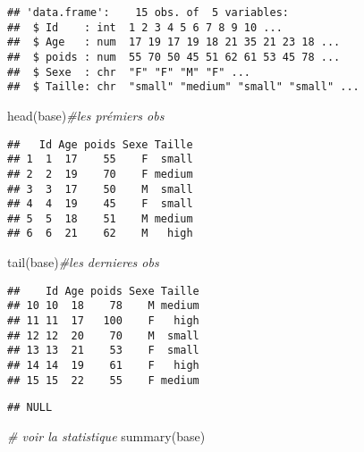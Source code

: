 \documentclass[
]{article}
\newenvironment{Shaded}{\begin{snugshade}}{\end{snugshade}}
\newcommand{\CommentTok}[1]{\textcolor[rgb]{0.56,0.35,0.01}{\textit{#1}}}
\newcommand{\FunctionTok}[1]{\textcolor[rgb]{0.00,0.00,0.00}{#1}}
\newcommand{\NormalTok}[1]{#1}
\newcommand{\SpecialCharTok}[1]{\textcolor[rgb]{0.00,0.00,0.00}{#1}}
\begin{document}
\begin{verbatim}
## 'data.frame':    15 obs. of  5 variables:
##  $ Id    : int  1 2 3 4 5 6 7 8 9 10 ...
##  $ Age   : num  17 19 17 19 18 21 35 21 23 18 ...
##  $ poids : num  55 70 50 45 51 62 61 53 45 78 ...
##  $ Sexe  : chr  "F" "F" "M" "F" ...
##  $ Taille: chr  "small" "medium" "small" "small" ...
\end{verbatim}

\begin{Shaded}
\begin{Highlighting}[]
\FunctionTok{head}\NormalTok{(base)}\CommentTok{\#les prémiers obs}
\end{Highlighting}
\end{Shaded}

\begin{verbatim}
##   Id Age poids Sexe Taille
## 1  1  17    55    F  small
## 2  2  19    70    F medium
## 3  3  17    50    M  small
## 4  4  19    45    F  small
## 5  5  18    51    M medium
## 6  6  21    62    M   high
\end{verbatim}

\begin{Shaded}
\begin{Highlighting}[]
\FunctionTok{tail}\NormalTok{(base)}\CommentTok{\#les dernieres obs}
\end{Highlighting}
\end{Shaded}

\begin{verbatim}
##    Id Age poids Sexe Taille
## 10 10  18    78    M medium
## 11 11  17   100    F   high
## 12 12  20    70    M  small
## 13 13  21    53    F  small
## 14 14  19    61    F   high
## 15 15  22    55    F medium
\end{verbatim}

\begin{Shaded}
\end{Shaded}

\begin{verbatim}
## NULL
\end{verbatim}

\begin{Shaded}
\begin{Highlighting}[]
\CommentTok{\# voir la statistique}
\FunctionTok{summary}\NormalTok{(base)}
\end{Highlighting}
\end{Shaded}
\end{document}

